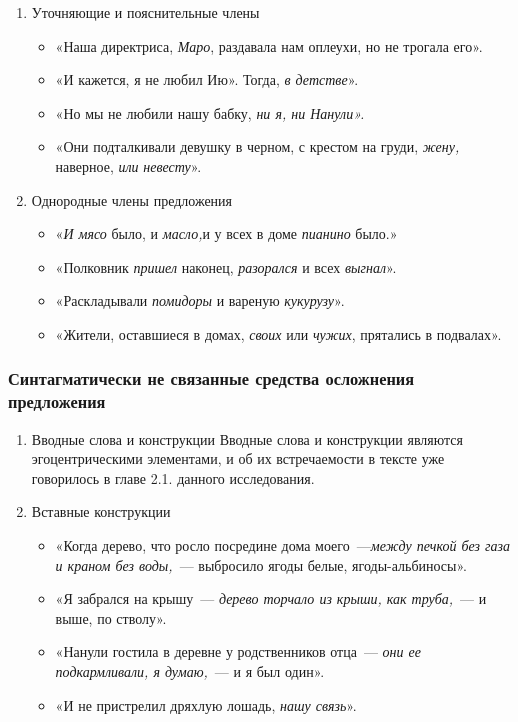 \documentclass{kursa4}
\begin{document}
{\begin{enumerate}
            \item Уточняющие и пояснительные члены \begin{itemize}
              \item «Наша директриса, \textit{Маро}, раздавала нам оплеухи, но не трогала его». \item «И кажется, я не любил Ию». Тогда, \textit{в детстве}». \item «Но мы не любили нашу бабку, \textit{ни я, ни Нанули».}
              \item «Они подталкивали девушку в черном, с крестом на груди, \textit{жену,} наверное, \textit{или} \textit{невесту}». \end{itemize}
        
            \item Однородные члены предложения \begin{itemize}
              \item «\textit{И мясо} было, и \textit{масло,}и у всех в доме \textit{пианино} было.» 
              \item «Полковник \textit{пришел} наконец, \textit{разорался} и всех \textit{выгнал}». \item «Раскладывали \textit{помидоры} и вареную \textit{кукурузу}». \item «Жители, оставшиеся в домах, \textit{своих} или \textit{чужих}, прятались в подвалах». \end{itemize}
          \end{enumerate}

      \subsubsection{Синтагматически не связанные средства осложнения предложения}

        \begin{enumerate}
          \item Вводные слова и конструкции \newline
          Вводные слова и конструкции являются эгоцентрическими элементами, и об их встречаемости в тексте уже говорилось в главе 2.1. данного исследования. 

          \item Вставные конструкции \begin{itemize}
            \item «Когда дерево, что росло посредине дома моего~---\textit{между печкой без газа и краном без воды,}~--- выбросило ягоды белые, ягоды-альбиносы». \item «Я забрался на крышу~--- \textit{дерево торчало из крыши, как труба,}~--- и выше, по стволу». \item «Нанули гостила в деревне у родственников отца~--- \textit{они ее подкармливали, я думаю,}~--- и я был один». \item «И не пристрелил дряхлую лошадь, \textit{нашу связь}». \end{itemize}


\end{enumerate}}
\end{document}
